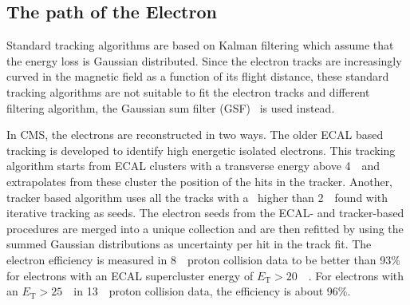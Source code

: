 %


\subsection{The path of the Electron}
\label{sec:ElectronTrack}
 Standard tracking algorithms are based on Kalman filtering which assume that the energy loss is Gaussian distributed. Since the  electron tracks are increasingly curved in the magnetic field as a function of its flight distance, these standard tracking algorithms are not suitable to fit the electron tracks and different filtering algorithm, the Gaussian sum filter (GSF)~\cite{0954-3899-31-9-N01} is used instead. 

In CMS, the electrons are reconstructed in two ways. The older ECAL based tracking is developed to identify high energetic isolated electrons. This tracking algorithm starts from ECAL clusters with a transverse energy above 4~\GeV\ and extrapolates from these cluster the position of the hits in the tracker. Another, tracker based algorithm uses all the tracks with a \pt\ higher than 2~\GeV\ found with iterative tracking as seeds. The electron seeds from the ECAL- and tracker-based procedures are merged into a unique collection and are then refitted  by using the summed Gaussian distributions as uncertainty per hit in the track fit. The electron efficiency is measured in 8~\TeV\ proton collision data to be better than 93\% for electrons with an ECAL supercluster energy of $E_{\mathrm{T}}>20$~\GeV~\cite{1748-0221-10-06-P06005}. For electrons with an  $E_{\mathrm{T}}>25$~\GeV\  in 13~\TeV\ proton collision data, the efficiency is about 96\%\cite{CMS-DP-2017-004}.


